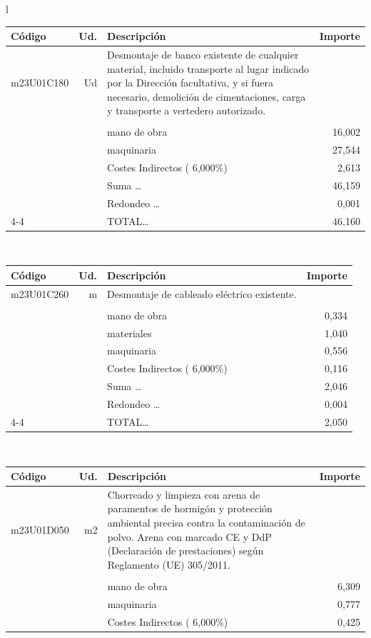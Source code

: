 \documentclass{book}%
\begin{document}
\begin{longtable}{l}
\begin{tabular}{l r p{60mm} r}%
Código&Ud.&Descripción&Importe\\%
\hline%
m23U01C180&Ud&Desmontaje de banco existente de cualquier material, incluido transporte al lugar indicado por la Dirección facultativa, y si fuera necesario, demolición de cimentaciones, carga y transporte a vertedero autorizado.&\\%
&&&\\%
&&mano de obra&    16,002\\%
&&maquinaria&    27,544\\%
&&Costes Indirectos (     6,000\%)&     2,613\\%
&&Suma \ldots&    46,159\\%
&&Redondeo \ldots&     0,001\\%
\cline{4-4}%
&&TOTAL\ldots&    46,160\\%
\end{tabular}\\%
\begin{tabular}{l r p{60mm} r}%
Código&Ud.&Descripción&Importe\\%
\hline%
m23U01C260&m&Desmontaje de cableado eléctrico existente.&\\%
&&&\\%
&&mano de obra&     0,334\\%
&&materiales&     1,040\\%
&&maquinaria&     0,556\\%
&&Costes Indirectos (     6,000\%)&     0,116\\%
&&Suma \ldots&     2,046\\%
&&Redondeo \ldots&     0,004\\%
\cline{4-4}%
&&TOTAL\ldots&     2,050\\%
\end{tabular}\\%
\begin{tabular}{l r p{60mm} r}%
Código&Ud.&Descripción&Importe\\%
\hline%
m23U01D050&m2&Chorreado y limpieza con arena de paramentos de hormigón y protección ambiental precisa contra la contaminación de polvo. Arena con marcado CE y DdP (Declaración de prestaciones) según Reglamento (UE) 305/2011.&\\%
&&&\\%
&&mano de obra&     6,309\\%
&&maquinaria&     0,777\\%
&&Costes Indirectos (     6,000\%)&     0,425\\%

\end{tabular}
\end{longtable}
\end{document}
